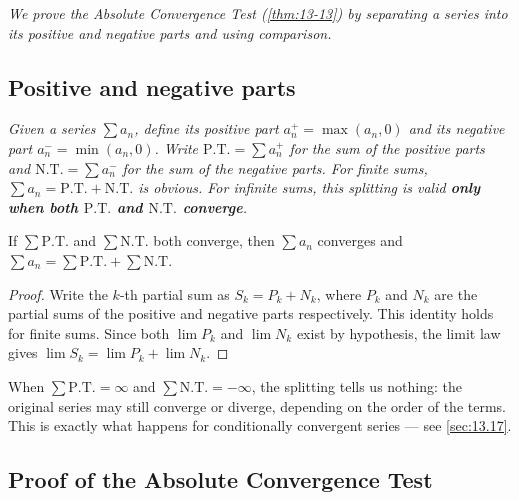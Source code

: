 \textit{We prove the Absolute Convergence Test (\cref{thm:13-13}) by separating a series into its positive and negative parts and using comparison.}

\subsection*{Positive and negative parts}

\textit{Given a series $\sum a_{n}$, define its \emph{positive part} $a_{n}^{+}=\max(a_{n},0)$ and its \emph{negative part} $a_{n}^{-}=\min(a_{n},0)$.  Write $\mathrm{P.T.}=\sum a_{n}^{+}$ for the sum of the positive parts and $\mathrm{N.T.}=\sum a_{n}^{-}$ for the sum of the negative parts.  For finite sums, $\sum a_{n}=\mathrm{P.T.}+\mathrm{N.T.}$ is obvious.  For infinite sums, this splitting is valid \textbf{only when both $\mathrm{P.T.}$ and $\mathrm{N.T.}$ converge}.}

\begin{lemma}
\label{lem:13-1}
If $\sum\mathrm{P.T.}$ and $\sum\mathrm{N.T.}$ both converge, then $\sum a_{n}$ converges and $\sum a_{n}=\sum\mathrm{P.T.}+\sum\mathrm{N.T.}$
\end{lemma}

\begin{proof}
Write the $k$-th partial sum as $S_{k}=P_{k}+N_{k}$, where $P_{k}$ and $N_{k}$ are the partial sums of the positive and negative parts respectively.  This identity holds for finite sums.  Since both $\lim P_{k}$ and $\lim N_{k}$ exist by hypothesis, the limit law gives $\lim S_{k}=\lim P_{k}+\lim N_{k}$.
\end{proof}

\begin{remark}
When $\sum\mathrm{P.T.}=\infty$ and $\sum\mathrm{N.T.}=-\infty$, the splitting tells us nothing: the original series may still converge or diverge, depending on the order of the terms.  This is exactly what happens for conditionally convergent series — see \cref{sec:13.17}.
\end{remark}

\subsection*{Proof of the Absolute Convergence Test}

